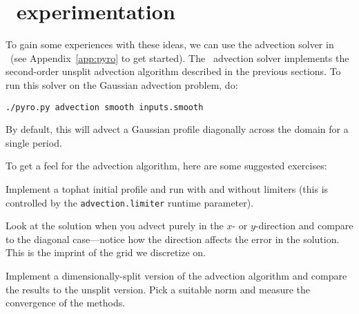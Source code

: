 \section{\pyro\ experimentation}

To gain some experiences with these ideas, we can use the advection
solver in \pyro\ (see Appendix~\ref{app:pyro} to get started).
The \pyro\ advection solver implements the second-order unsplit
advection algorithm described in the previous sections.  To run
this solver on the Gaussian advection problem, do:
\begin{verbatim}
./pyro.py advection smooth inputs.smooth
\end{verbatim}
By default, this will advect a Gaussian profile diagonally across the
domain for a single period.

To get a feel for the advection algorithm, here are some suggested
exercises:

\begin{exercise}
{Implement a tophat initial profile and run with and without limiters
  (this is controlled by the {\tt advection.limiter} runtime
  parameter).}
\end{exercise}

\begin{exercise}
{Look at the solution when you advect purely in the $x$- or
  $y$-direction and compare to the diagonal case---notice how the
  direction affects the error in the solution.  This is the imprint
  of the grid we discretize on.}
\end{exercise}

\begin{exercise}
{Implement a dimensionally-split version of the advection algorithm
and compare the results to the unsplit version.  Pick a suitable norm
and measure the convergence of the methods.}
\end{exercise}
